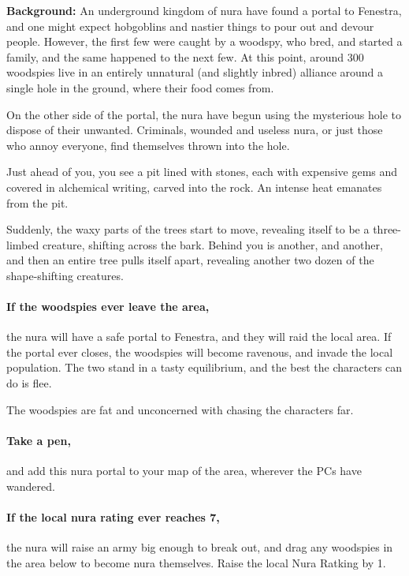 \textbf{Background:}
An underground kingdom of nura have found a portal to Fenestra, and one might expect hobgoblins and nastier things to pour out and devour people.
However, the first few were caught by a woodspy, who bred, and started a family, and the same happened to the next few.
At this point, around 300 woodspies live in an entirely unnatural (and slightly inbred) alliance around a single hole in the ground, where their food comes from.

On the other side of the portal, the nura have begun using the mysterious hole to dispose of their unwanted.
Criminals, wounded and useless nura, or just those who annoy everyone, find themselves thrown into the hole.

\begin{boxtext}

  Just ahead of you, you see a pit lined with stones, each with expensive gems and covered in alchemical writing, carved into the rock.
  An intense heat emanates from the pit.

  Suddenly, the waxy parts of the trees start to move, revealing itself to be a three-limbed creature, shifting across the bark.
  Behind you is another, and another, and then an entire tree pulls itself apart, revealing another two dozen of the shape-shifting creatures.

\end{boxtext}

\paragraph{If the woodspies ever leave the area,}
the nura will have a safe portal to Fenestra, and they will raid the local area.
If the portal ever closes, the woodspies will become ravenous, and invade the local population.
The two stand in a tasty equilibrium, and the best the characters can do is flee.

The woodspies are fat and unconcerned with chasing the characters far.


\paragraph{Take a pen,}
and add this nura portal to your map of the area, wherever the PCs have wandered.

\paragraph{If the local nura rating ever reaches 7,}
the nura will raise an army big enough to break out, and drag any woodspies in the area below to become nura themselves.
Raise the local Nura Ratking by 1.


\stopcontents[sq]


